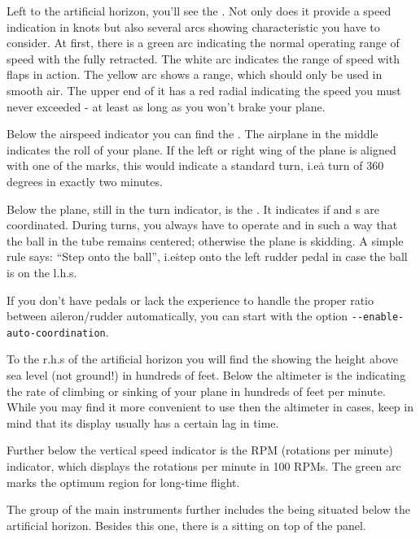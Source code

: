 Left to the artificial horizon, you'll see the . Not
only does
it provide a speed indication in knots but also several arcs showing
characteristic
 you have to consider. At first, there is a green arc
indicating
the normal operating range of speed with the  fully retracted. The
white arc
indicates the range of speed with flaps in action. The yellow arc shows a range,
which
should only be used in smooth air. The upper end of it has a red radial
indicating the
speed you must never exceeded - at least as long as you won't brake your plane.

Below the airspeed indicator you can find the . The
airplane in the
middle indicates the roll of your plane. If the left or right wing of the plane
is
aligned with one of the marks, this would indicate a standard turn, i.e\. a turn
of 360
degrees in exactly two minutes.

Below the plane, still in the turn indicator, is the . It
indicates
if  and s are coordinated. During turns, you always
have to
operate  and  in such a way that the ball in the
tube
remains centered; otherwise the plane is skidding. A simple rule says:
``Step onto the ball'', i.e\. step onto the left rudder pedal in case
the ball is on the l.h.s.
\medskip

If you don't have pedals or lack the experience to handle the proper
ratio between aileron/rudder automatically, you can start \FlightGear{}
with the option \texttt{-$ $-enable-auto-coordination}.

To the r.h.s of the artificial horizon you will find the 
showing the height
above sea level (not ground!) in hundreds of feet.  Below the altimeter is the
 indicating the rate of climbing or sinking of
your plane
in hundreds of feet per minute. While you may find it more convenient to use
then the
altimeter in cases, keep in mind that its display usually has a certain lag in
time.

Further below the vertical speed indicator is the RPM (rotations per minute)
indicator, which displays the rotations per minute  in 100
RPMs. The
green arc marks the optimum region for long-time flight.

The group of the main instruments further includes the 
being
situated below the artificial horizon. Besides this one, there is a
 sitting on top of the panel.

